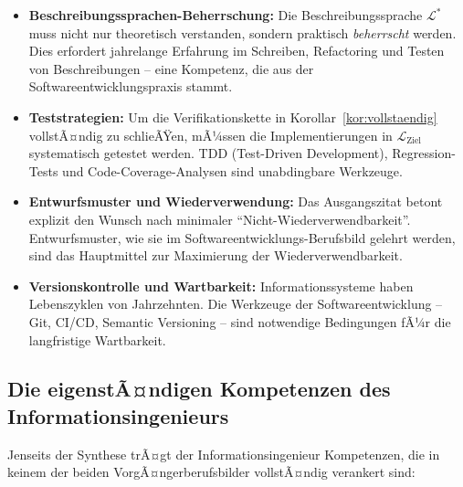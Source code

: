 ﻿\documentclass[a4paper,12pt]{report}
\theoremstyle{definition}
\begin{document}
\begin{itemize}
  \item \textbf{Beschreibungssprachen-Beherrschung:}
        Die Beschreibungssprache $\mathcal{L}^*$ muss nicht nur theoretisch
        verstanden, sondern praktisch \emph{beherrscht} werden. Dies erfordert
        jahrelange Erfahrung im Schreiben, Refactoring und Testen von Beschreibungen --
        eine Kompetenz, die aus der Softwareentwicklungspraxis stammt.
  \item \textbf{Teststrategien:}
        Um die Verifikationskette in Korollar~\ref{kor:vollstaendig} vollstÃ¤ndig
        zu schlieÃŸen, mÃ¼ssen die Implementierungen in $\mathcal{L}_{\text{Ziel}}$
        systematisch getestet werden. TDD (Test-Driven Development), Regression-Tests
        und Code-Coverage-Analysen sind unabdingbare Werkzeuge.
  \item \textbf{Entwurfsmuster und Wiederverwendung:}
        Das Ausgangszitat betont explizit den Wunsch nach minimaler
        \enquote{Nicht-Wiederverwendbarkeit}. Entwurfsmuster, wie sie im
        Softwareentwicklungs-Berufsbild gelehrt werden, sind das Hauptmittel zur
        Maximierung der Wiederverwendbarkeit.
  \item \textbf{Versionskontrolle und Wartbarkeit:}
        Informationssysteme haben Lebenszyklen von Jahrzehnten. Die Werkzeuge der
        Softwareentwicklung -- Git, CI/CD, Semantic Versioning -- sind notwendige
        Bedingungen fÃ¼r die langfristige Wartbarkeit.
\end{itemize}

\subsection{Die eigenstÃ¤ndigen Kompetenzen des Informationsingenieurs}

Jenseits der Synthese trÃ¤gt der Informationsingenieur Kompetenzen, die in keinem der
beiden VorgÃ¤ngerberufsbilder vollstÃ¤ndig verankert sind:
\end{document}
